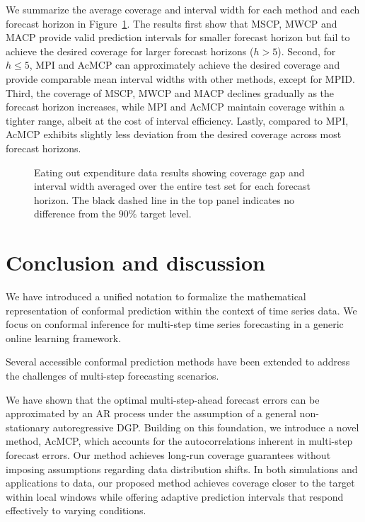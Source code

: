\documentclass[
  11pt,
  a4paper,
]{article}
\theoremstyle{plain}
\theoremstyle{remark}
\begin{document}
We summarize the average coverage and interval width for each method and
each forecast horizon in Figure~\ref{fig-cafe_cov}. The results first
show that MSCP, MWCP and MACP provide valid prediction intervals for
smaller forecast horizon but fail to achieve the desired coverage for
larger forecast horizons (\(h>5\)). Second, for \(h \leq 5\), MPI and
AcMCP can approximately achieve the desired coverage and provide
comparable mean interval widths with other methods, except for MPID.
Third, the coverage of MSCP, MWCP and MACP declines gradually as the
forecast horizon increases, while MPI and AcMCP maintain coverage within
a tighter range, albeit at the cost of interval efficiency. Lastly,
compared to MPI, AcMCP exhibits slightly less deviation from the desired
coverage across most forecast horizons.

\begin{figure}


\caption{\label{fig-cafe_cov}Eating out expenditure data results showing
coverage gap and interval width averaged over the entire test set for
each forecast horizon. The black dashed line in the top panel indicates
no difference from the \(90\%\) target level.}

\end{figure}%

\section{Conclusion and discussion}\label{conclusion-and-discussion}

We have introduced a unified notation to formalize the mathematical
representation of conformal prediction within the context of time series
data. We focus on conformal inference for multi-step time series
forecasting in a generic online learning framework.

Several accessible conformal prediction methods have been extended to
address the challenges of multi-step forecasting scenarios.

We have shown that the optimal multi-step-ahead forecast errors can be
approximated by an AR process under the assumption of a general
non-stationary autoregressive DGP. Building on this foundation, we
introduce a novel method, AcMCP, which accounts for the autocorrelations
inherent in multi-step forecast errors. Our method achieves long-run
coverage guarantees without imposing assumptions regarding data
distribution shifts. In both simulations and applications to data, our
proposed method achieves coverage closer to the target within local
windows while offering adaptive prediction intervals that respond
effectively to varying conditions.
\end{document}
